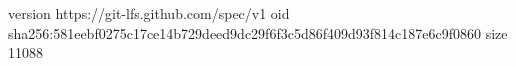version https://git-lfs.github.com/spec/v1
oid sha256:581eebf0275c17ce14b729deed9dc29f6f3c5d86f409d93f814c187e6c9f0860
size 11088
